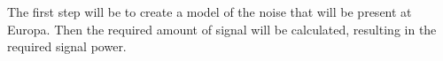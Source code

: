 \documentclass{article}
\begin{document}
The first step will be to create a model of the noise that will be present at Europa. Then the required amount of signal will be calculated, resulting in the required signal power. 










%


%
\end{document}
